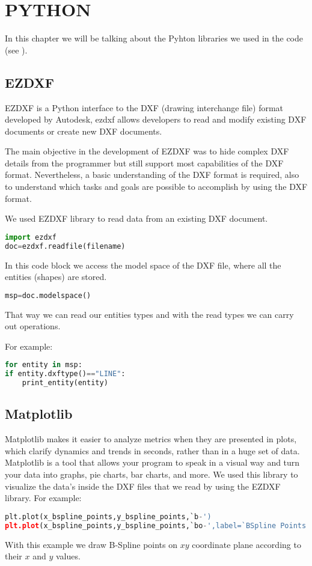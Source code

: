 \chapter{PYTHON}

In this chapter we will be talking about the Pyhton libraries we used in the code (see \cite{pythonweb}).

\section*{EZDXF}

EZDXF is a Python interface to the DXF (drawing interchange file) format developed by Autodesk, ezdxf allows developers to read and modify existing DXF documents or create new DXF documents.

The main objective in the development of EZDXF was to hide complex DXF details from the programmer but still support most capabilities of the DXF format. Nevertheless, a basic understanding of the DXF format is required, also to understand which tasks and goals are possible to accomplish by using the DXF format.

We used EZDXF library to read data from an existing DXF document.

\begin{lstlisting}[language=Python]
import ezdxf
doc=ezdxf.readfile(filename)
\end{lstlisting}

In this code block we access the model space of the DXF file, where all the entities (shapes) are stored.

\begin{lstlisting}[language=Python]
msp=doc.modelspace()
\end{lstlisting}

That way we can read our entities types and with the read types we can carry out operations.

For example:
\begin{lstlisting}[language=Python]
for entity in msp:
if entity.dxftype()=="LINE":
    print_entity(entity)
\end{lstlisting}


\section*{Matplotlib}
 Matplotlib makes it easier to analyze metrics when they are presented in plots,
 which clarify dynamics and trends in seconds, rather than in a huge set of data.
 Matplotlib is a tool that allows your program to speak in a visual way and turn your data into graphs,
 pie charts, bar charts, and more.
 We used this library to visualize the data's inside the DXF files that we read by using the EZDXF library.
 For example:
\begin{lstlisting}[language=Python]
plt.plot(x_bspline_points,y_bspline_points,`b-')
plt.plot(x_bspline_points,y_bspline_points,`bo-',label=`BSpline Points',alpha=0.75)
\end{lstlisting}        
With this example we draw B-Spline points on $xy$ coordinate plane according to their $x$ and $y$ values.
 
